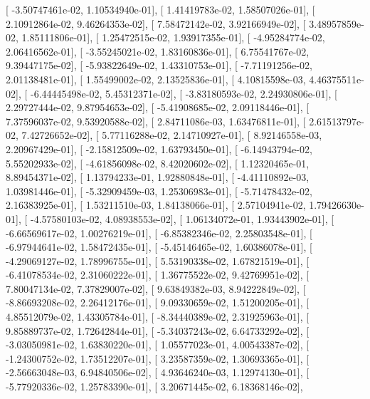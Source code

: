\documentclass{article}
\begin{document}
       [ -3.50747461e-02,   1.10534940e-01],
       [  1.41419783e-02,   1.58507026e-01],
       [  2.10912864e-02,   9.46264353e-02],
       [  7.58472142e-02,   3.92166949e-02],
       [  3.48957859e-02,   1.85111806e-01],
       [  1.25472515e-02,   1.93917355e-01],
       [ -4.95284774e-02,   2.06416562e-01],
       [ -3.55245021e-02,   1.83160836e-01],
       [  6.75541767e-02,   9.39447175e-02],
       [ -5.93822649e-02,   1.43310753e-01],
       [ -7.71191256e-02,   2.01138481e-01],
       [  1.55499002e-02,   2.13525836e-01],
       [  4.10815598e-03,   4.46375511e-02],
       [ -6.44445498e-02,   5.45312371e-02],
       [ -3.83180593e-02,   2.24930806e-01],
       [  2.29727444e-02,   9.87954653e-02],
       [ -5.41908685e-02,   2.09118446e-01],
       [  7.37596037e-02,   9.53920588e-02],
       [  2.84711086e-03,   1.63476811e-01],
       [  2.61513797e-02,   7.42726652e-02],
       [  5.77116288e-02,   2.14710927e-01],
       [  8.92146558e-03,   2.20967429e-01],
       [ -2.15812509e-02,   1.63793450e-01],
       [ -6.14943794e-02,   5.55202933e-02],
       [ -4.61856098e-02,   8.42020602e-02],
       [  1.12320465e-01,   8.89454371e-02],
       [  1.13794233e-01,   1.92880848e-01],
       [ -4.41110892e-03,   1.03981446e-01],
       [ -5.32909459e-03,   1.25306983e-01],
       [ -5.71478432e-02,   2.16383925e-01],
       [  1.53211510e-03,   1.84138066e-01],
       [  2.57104941e-02,   1.79426630e-01],
       [ -4.57580103e-02,   4.08938553e-02],
       [  1.06134072e-01,   1.93443902e-01],
       [ -6.66569617e-02,   1.00276219e-01],
       [ -6.85382346e-02,   2.25803548e-01],
       [ -6.97944641e-02,   1.58472435e-01],
       [ -5.45146465e-02,   1.60386078e-01],
       [ -4.29069127e-02,   1.78996755e-01],
       [  5.53190338e-02,   1.67821519e-01],
       [ -6.41078534e-02,   2.31060222e-01],
       [  1.36775522e-02,   9.42769951e-02],
       [  7.80047134e-02,   7.37829007e-02],
       [  9.63849382e-03,   8.94222849e-02],
       [ -8.86693208e-02,   2.26412176e-01],
       [  9.09330659e-02,   1.51200205e-01],
       [  4.85512079e-02,   1.43305784e-01],
       [ -8.34440389e-02,   2.31925963e-01],
       [  9.85889737e-02,   1.72642844e-01],
       [ -5.34037243e-02,   6.64733292e-02],
       [ -3.03050981e-02,   1.63830220e-01],
       [  1.05577023e-01,   4.00543387e-02],
       [ -1.24300752e-02,   1.73512207e-01],
       [  3.23587359e-02,   1.30693365e-01],
       [ -2.56663048e-03,   6.94840506e-02],
       [  4.93646240e-03,   1.12974130e-01],
       [ -5.77920336e-02,   1.25783390e-01],
       [  3.20671445e-02,   6.18368146e-02],
\end{document}

